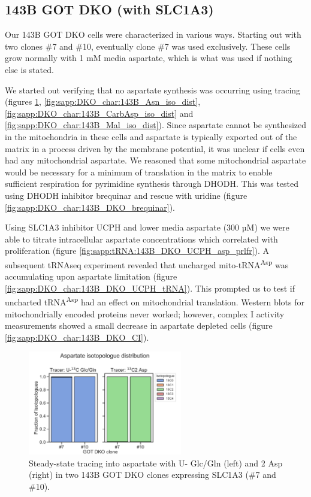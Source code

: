 \subsection{143B GOT DKO (with SLC1A3)}
Our 143B GOT DKO cells were characterized in various ways.
Starting out with two clones \#7 and \#10, eventually clone \#7 was used exclusively.
These cells grow normally with 1 mM media aspartate, which is what was used if nothing else is stated.

We started out verifying that no aspartate synthesis was occurring using \hCi{} tracing (figures \ref{fig:sapp:DKO_char:143B_Asp_iso_dist}, \ref{fig:sapp:DKO_char:143B_Asn_iso_dist}, \ref{fig:sapp:DKO_char:143B_CarbAsp_iso_dist} and \ref{fig:sapp:DKO_char:143B_Mal_iso_dist}).
Since aspartate cannot be synthesized in the mitochondria in these cells and aspartate is typically exported out of the matrix in a process driven by the membrane potential, it was unclear if cells even had any mitochondrial aspartate.
We reasoned that some mitochondrial aspartate would be necessary for a minimum of translation in the matrix to enable sufficient respiration for pyrimidine synthesis through DHODH.
This was tested using DHODH inhibitor brequinar and rescue with uridine (figure \ref{fig:sapp:DKO_char:143B_DKO_brequinar}).

Using SLC1A3 inhibitor UCPH and lower media aspartate (300 µM) we were able to titrate intracellular aspartate concentrations which correlated with proliferation (figure \ref{fig:sapp:tRNA:143B_DKO_UCPH_asp_prlfr}).
A subsequent tRNAseq experiment revealed that uncharged mito-tRNA\textsuperscript{Asp} was accumulating upon aspartate limitation (figure \ref{fig:sapp:DKO_char:143B_DKO_UCPH_tRNA}).
This prompted us to test if uncharted tRNA\textsuperscript{Asp} had an effect on mitochondrial translation.
Western blots for mitochondrially encoded proteins never worked; however, complex I activity measurements showed a small decrease in aspartate depleted cells (figure \ref{fig:sapp:DKO_char:143B_DKO_CI}).



\begin{figure}[ht]
    \centering
    \includegraphics[width=0.6\textwidth]{figures/sapp/DKO_char/143B_Asp_iso_dist.pdf}
    \caption[\hCi{} Gln/Glc, Asp tracing in 143B GOT DKO, Asp]{
    Steady-state tracing into aspartate with U-\hCi{} Glc/Gln (left) and \hCi{}2 Asp (right) in two 143B GOT DKO clones expressing SLC1A3 (\#7 and \#10).
    }
    \label{fig:sapp:DKO_char:143B_Asp_iso_dist}
\end{figure}

